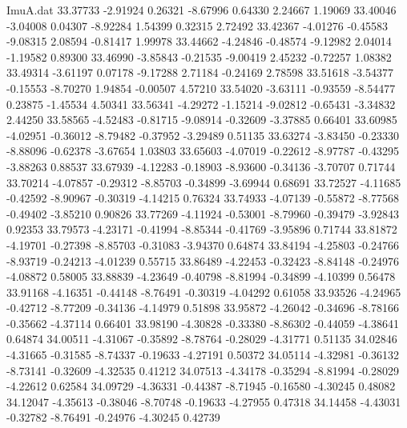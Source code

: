 \begin{filecontents}{ImuA.dat}
  33.37733   -2.91924    0.26321   -8.67996    0.64330    2.24667    1.19069
  33.40046   -3.04008    0.04307   -8.92284    1.54399    0.32315    2.72492
  33.42367   -4.01276   -0.45583   -9.08315    2.08594   -0.81417    1.99978
  33.44662   -4.24846   -0.48574   -9.12982    2.04014   -1.19582    0.89300
  33.46990   -3.85843   -0.21535   -9.00419    2.45232   -0.72257    1.08382
  33.49314   -3.61197    0.07178   -9.17288    2.71184   -0.24169    2.78598
  33.51618   -3.54377   -0.15553   -8.70270    1.94854   -0.00507    4.57210
  33.54020   -3.63111   -0.93559   -8.54477    0.23875   -1.45534    4.50341
  33.56341   -4.29272   -1.15214   -9.02812   -0.65431   -3.34832    2.44250
  33.58565   -4.52483   -0.81715   -9.08914   -0.32609   -3.37885    0.66401
  33.60985   -4.02951   -0.36012   -8.79482   -0.37952   -3.29489    0.51135
  33.63274   -3.83450   -0.23330   -8.88096   -0.62378   -3.67654    1.03803
  33.65603   -4.07019   -0.22612   -8.97787   -0.43295   -3.88263    0.88537
  33.67939   -4.12283   -0.18903   -8.93600   -0.34136   -3.70707    0.71744
  33.70214   -4.07857   -0.29312   -8.85703   -0.34899   -3.69944    0.68691
  33.72527   -4.11685   -0.42592   -8.90967   -0.30319   -4.14215    0.76324
  33.74933   -4.07139   -0.55872   -8.77568   -0.49402   -3.85210    0.90826
  33.77269   -4.11924   -0.53001   -8.79960   -0.39479   -3.92843    0.92353
  33.79573   -4.23171   -0.41994   -8.85344   -0.41769   -3.95896    0.71744
  33.81872   -4.19701   -0.27398   -8.85703   -0.31083   -3.94370    0.64874
  33.84194   -4.25803   -0.24766   -8.93719   -0.24213   -4.01239    0.55715
  33.86489   -4.22453   -0.32423   -8.84148   -0.24976   -4.08872    0.58005
  33.88839   -4.23649   -0.40798   -8.81994   -0.34899   -4.10399    0.56478
  33.91168   -4.16351   -0.44148   -8.76491   -0.30319   -4.04292    0.61058
  33.93526   -4.24965   -0.42712   -8.77209   -0.34136   -4.14979    0.51898
  33.95872   -4.26042   -0.34696   -8.78166   -0.35662   -4.37114    0.66401
  33.98190   -4.30828   -0.33380   -8.86302   -0.44059   -4.38641    0.64874
  34.00511   -4.31067   -0.35892   -8.78764   -0.28029   -4.31771    0.51135
  34.02846   -4.31665   -0.31585   -8.74337   -0.19633   -4.27191    0.50372
  34.05114   -4.32981   -0.36132   -8.73141   -0.32609   -4.32535    0.41212
  34.07513   -4.34178   -0.35294   -8.81994   -0.28029   -4.22612    0.62584
  34.09729   -4.36331   -0.44387   -8.71945   -0.16580   -4.30245    0.48082
  34.12047   -4.35613   -0.38046   -8.70748   -0.19633   -4.27955    0.47318
  34.14458   -4.43031   -0.32782   -8.76491   -0.24976   -4.30245    0.42739

\end{filecontents}
